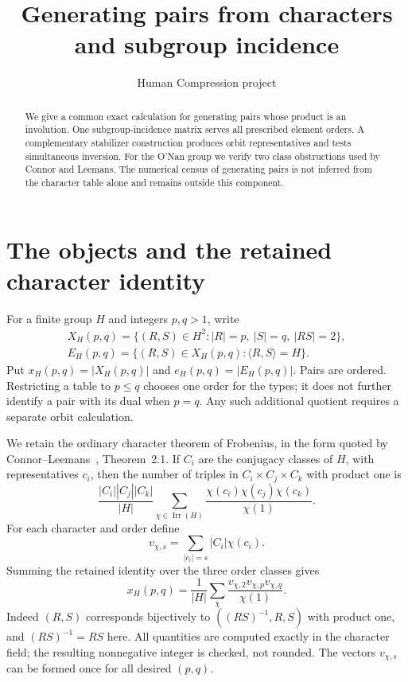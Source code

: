 \documentclass[11pt,a4paper]{article}
\title{Generating pairs from characters and subgroup incidence}
\author{Human Compression project}
\date{}
\newcommand{\gen}[1]{\langle#1\rangle}
\begin{document}
\maketitle
\begin{abstract}
We give a common exact calculation for generating pairs whose product is
an involution. One subgroup-incidence matrix serves all prescribed element
orders. A complementary stabilizer construction produces orbit representatives
and tests simultaneous inversion. For the O'Nan group we verify two class
obstructions used by Connor and Leemans. The numerical census of generating
pairs is not inferred from the character table alone and remains outside
this component.
\end{abstract}

\section{The objects and the retained character identity}
For a finite group $H$ and integers $p,q>1$, write
\[
 \begin{gathered}
 X_H(p,q)=\{(R,S)\in H^2:|R|=p,\ |S|=q,\ |RS|=2\},\\
 E_H(p,q)=\{(R,S)\in X_H(p,q):\gen{R,S}=H\}.
 \end{gathered}
\]
Put $x_H(p,q)=|X_H(p,q)|$ and $e_H(p,q)=|E_H(p,q)|$.
Pairs are ordered. Restricting a table to $p\leq q$ chooses one order for
the types; it does not further identify a pair with its dual when $p=q$.
Any such additional quotient requires a separate orbit calculation.

We retain the ordinary character theorem of Frobenius, in the form quoted
by Connor--Leemans~\cite{CL}, Theorem~2.1. If $C_i$ are the conjugacy
classes of $H$, with representatives $c_i$, then the number of triples
in $C_i\times C_j\times C_k$ with product one is
\[
 \frac{|C_i||C_j||C_k|}{|H|}
 \sum_{\chi\in\operatorname{Irr}(H)}
 \frac{\chi(c_i)\chi(c_j)\chi(c_k)}{\chi(1)}.
\]
For each character and order define
\[
 v_{\chi,s}=\sum_{|c_i|=s}|C_i|\chi(c_i).
\]
Summing the retained identity over the three order classes gives
\begin{equation}\label{char}
 x_H(p,q)=\frac1{|H|}\sum_\chi
       \frac{v_{\chi,2}v_{\chi,p}v_{\chi,q}}{\chi(1)}.
\end{equation}
Indeed $(R,S)$ corresponds bijectively to $((RS)^{-1},R,S)$ with product
one, and $(RS)^{-1}=RS$ here. All quantities are computed exactly in the
character field; the resulting nonnegative integer is checked, not rounded.
The vectors $v_{\chi,s}$ can be formed once for all desired $(p,q)$.
\end{document}
